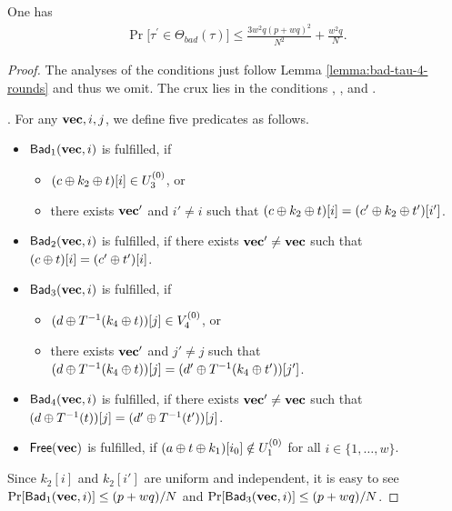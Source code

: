 \begin{lemma}
	\label{lemma:bad-tau-6-rounds}
	
	One has
	\begin{align}
	{\Pr}\big[\tau^{\prime} \in \Theta_{bad}(\tau)\big] \leq \frac{3w^{2} q \left(p+w q\right)^{2}}{N^{2}} + \frac{w^{2} q}{N}.
	\label{eq:bound-bad-tau-6-rounds}
	\end{align}
\end{lemma}
\begin{proof}
The analyses of the conditions just follow Lemma \ref{lemma:bad-tau-4-rounds} and thus we omit. The crux lies in the conditions \cfour, \cfive, and \csix.


\newpage

\arrangespace

\noindent \textsc{\cfour}. For any $\mathbf{vec},i,j$, we define five predicates as follows.
%
\begin{itemize}
	\item $\mathsf{Bad}_1(\mathbf{vec},i)$ is fulfilled, if
	\begin{itemize}
		\item $(c\oplus k_2\oplus t)[i]\in U_3^{(0)}$, or
		\item there exists $\mathbf{vec}'$ and $i'\neq i$ such that $(c\oplus k_2\oplus t)[i]=(c'\oplus k_2\oplus t')[i']$.
	\end{itemize}
	\item $\mathsf{Bad}_2(\mathbf{vec},i)$ is fulfilled, if there exists $\mathbf{vec}'\neq\mathbf{vec}$ such that $(c\oplus t)[i]=(c'\oplus t')[i]$.
	\item $\mathsf{Bad}_3(\mathbf{vec},i)$ is fulfilled, if
	\begin{itemize}
		\item $(d\oplus T^{-1}(k_4\oplus t))[j]\in V_4^{(0)}$, or
		\item there exists $\mathbf{vec}'$ and $j'\neq j$ such that $(d\oplus T^{-1}(k_4\oplus t))[j]=(d'\oplus T^{-1}(k_4\oplus t'))[j']$.
	\end{itemize}
	\item $\mathsf{Bad}_4(\mathbf{vec},i)$ is fulfilled, if there exists $\mathbf{vec}'\neq\mathbf{vec}$ such that $(d\oplus T^{-1}(t))[j]=(d'\oplus T^{-1}(t'))[j]$.
	\item $\mathsf{Free}(\mathbf{vec})$ is fulfilled, if $(a\oplus t\oplus k_1)[i_0]\notin U_1^{(0)}$ for all $i\in\{1,\ldots,w\}$.
\end{itemize}
%
Since $k_2[i]$ and $k_2[i']$ are uniform and independent, it is easy to see $\Pr[\mathsf{Bad}_1(\mathbf{vec},i)]\leq(p+wq)/N$ and $\Pr[\mathsf{Bad}_3(\mathbf{vec},i)]\leq(p+wq)/N$.



\end{proof}
